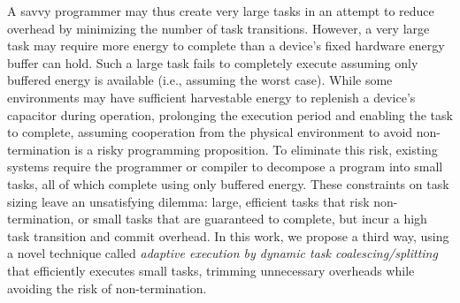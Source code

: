A savvy programmer may thus create very large tasks in an attempt to reduce
overhead by minimizing the number of task transitions. However, a very large
task may require more energy to complete than a device's fixed hardware energy
buffer can hold. Such a large task fails to completely execute assuming only
buffered energy is available (i.e., assuming the worst case). While some
environments may have sufficient harvestable energy to replenish a device's
capacitor during operation, prolonging the execution period and enabling the
task to complete, assuming cooperation from the physical environment to avoid
non-termination is a risky programming proposition. To eliminate this risk,
existing systems require the programmer or compiler to decompose a program
into small tasks, all of which complete using only buffered energy. These
constraints on task sizing leave an unsatisfying dilemma: large, efficient
tasks that risk non-termination, or small tasks that are guaranteed to
complete, but incur a high task transition and commit overhead. In this work,
we propose a third way, using a novel technique called {\em adaptive execution by dynamic task
coalescing/splitting} that efficiently executes small tasks, trimming unnecessary overheads while avoiding the risk of non-termination.


